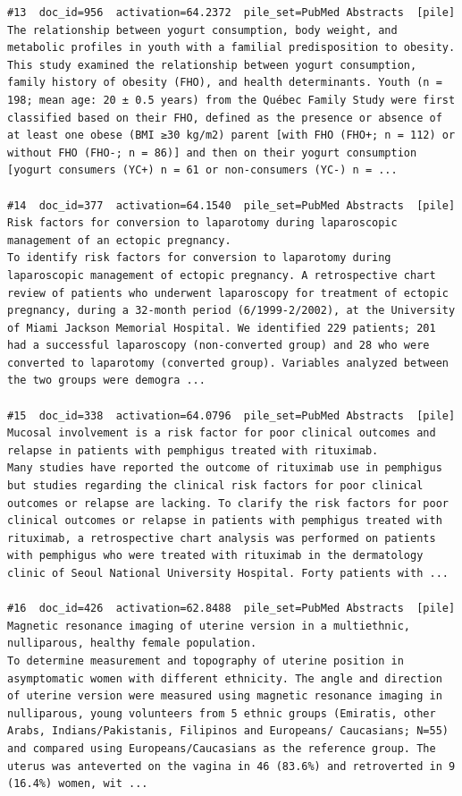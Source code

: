 \begin{verbatim}
#13  doc_id=956  activation=64.2372  pile_set=PubMed Abstracts  [pile]
The relationship between yogurt consumption, body weight, and metabolic profiles in youth with a familial predisposition to obesity.
This study examined the relationship between yogurt consumption, family history of obesity (FHO), and health determinants. Youth (n = 198; mean age: 20 ± 0.5 years) from the Québec Family Study were first classified based on their FHO, defined as the presence or absence of at least one obese (BMI ≥30 kg/m2) parent [with FHO (FHO+; n = 112) or without FHO (FHO-; n = 86)] and then on their yogurt consumption [yogurt consumers (YC+) n = 61 or non-consumers (YC-) n = ...

#14  doc_id=377  activation=64.1540  pile_set=PubMed Abstracts  [pile]
Risk factors for conversion to laparotomy during laparoscopic management of an ectopic pregnancy.
To identify risk factors for conversion to laparotomy during laparoscopic management of ectopic pregnancy. A retrospective chart review of patients who underwent laparoscopy for treatment of ectopic pregnancy, during a 32-month period (6/1999-2/2002), at the University of Miami Jackson Memorial Hospital. We identified 229 patients; 201 had a successful laparoscopy (non-converted group) and 28 who were converted to laparotomy (converted group). Variables analyzed between the two groups were demogra ...

#15  doc_id=338  activation=64.0796  pile_set=PubMed Abstracts  [pile]
Mucosal involvement is a risk factor for poor clinical outcomes and relapse in patients with pemphigus treated with rituximab.
Many studies have reported the outcome of rituximab use in pemphigus but studies regarding the clinical risk factors for poor clinical outcomes or relapse are lacking. To clarify the risk factors for poor clinical outcomes or relapse in patients with pemphigus treated with rituximab, a retrospective chart analysis was performed on patients with pemphigus who were treated with rituximab in the dermatology clinic of Seoul National University Hospital. Forty patients with ...

#16  doc_id=426  activation=62.8488  pile_set=PubMed Abstracts  [pile]
Magnetic resonance imaging of uterine version in a multiethnic, nulliparous, healthy female population.
To determine measurement and topography of uterine position in asymptomatic women with different ethnicity. The angle and direction of uterine version were measured using magnetic resonance imaging in nulliparous, young volunteers from 5 ethnic groups (Emiratis, other Arabs, Indians/Pakistanis, Filipinos and Europeans/ Caucasians; N=55) and compared using Europeans/Caucasians as the reference group. The uterus was anteverted on the vagina in 46 (83.6%) and retroverted in 9 (16.4%) women, wit ...


\end{verbatim}
